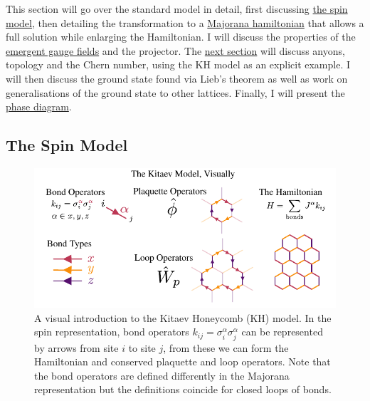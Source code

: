 This section will go over the standard model in detail, first discussing \protect\hyperlink{the-spin-model}{the spin model}, then detailing the transformation to a \protect\hyperlink{the-majorana-model}{Majorana hamiltonian} that allows a full solution while enlarging the Hamiltonian. I will discuss the properties of the \protect\hyperlink{an-emergent-gauge-field}{emergent gauge fields} and the projector. The \protect\hyperlink{sec:anyons}{next section} will discuss anyons, topology and the Chern number, using the KH model as an explicit example. I will then discuss the ground state found via Lieb's theorem as well as work on generalisations of the ground state to other lattices. Finally, I will present the \protect\hyperlink{ground-state-phases}{phase diagram}.

\hypertarget{the-spin-model}{%
\subsection{The Spin Model}\label{the-spin-model}}

\hypertarget{fig:visual_kitaev_1}{%
\begin{figure}
\centering
\includegraphics[width=1\textwidth,height=\textheight]{figure_code/amk_chapter/visual_kitaev_1}
\caption[{A Visual Intro to the Kitaev Model}]{A visual introduction to the Kitaev Honeycomb (KH) model. In the spin representation, bond operators \(k_{ij} = \sigma^\alpha_i \sigma^\alpha_j\) can be represented by arrows from site \(i\) to site \(j\), from these we can form the Hamiltonian and conserved plaquette and loop operators. Note that the bond operators are defined differently in the Majorana representation but the definitions coincide for closed loops of bonds.}
\label{fig:visual_kitaev_1}
\end{figure}
}

